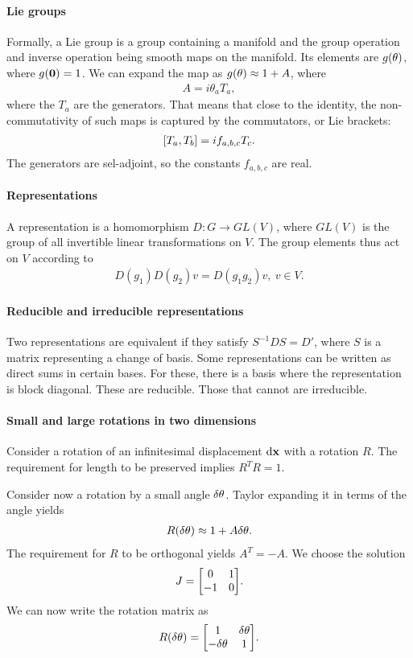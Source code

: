 \paragraph{Lie groups}
Formally, a Lie group is a group containing a manifold and the group operation and inverse operation being smooth maps on the manifold. Its elements are $g(\vb{\theta})$, where $g(\vb{0}) = 1$. We can expand the map as $g(\vb{\theta})\approx 1 + A$, where
\begin{align*}
A = i\theta_{a}T_{a},
\end{align*}
where the $T_{a}$ are the generators. That means that close to the identity, the non-commutativity of such maps is captured by the commutators, or Lie brackets:
\begin{align*}
\left[T_{a}, T_{b}\right] = if_{a, b, c}T_{c}.
\end{align*}
The generators are sel-adjoint, so the constants $f_{a, b, c}$ are real.

\paragraph{Representations}
A representation is a homomorphism $D: G\to GL(V)$, where $GL(V)$ is the group of all invertible linear transformations on $V$. The group elements thus act on $V$ according to
\begin{align*}
D(g_{1})D(g_{2})v = D(g_{1}g_{2})v,\ v\in V.
\end{align*}

\paragraph{Reducible and irreducible representations}
Two representations are equivalent if they satisfy $S^{-1}DS = D'$, where $S$ is a matrix representing a change of basis. Some representations can be written as direct sums in certain bases. For these, there is a basis where the representation is block diagonal. These are reducible. Those that cannot are irreducible.

\paragraph{Small and large rotations in two dimensions}
Consider a rotation of an infinitesimal displacement $\dd{\vb{x}}$ with a rotation $R$. The requirement for length to be preserved implies $R^{T}R = 1$.

Consider now a rotation by a small angle $\delta \theta$. Taylor expanding it in terms of the angle yields
\begin{align*}
R(\delta \theta) \approx 1 + A\delta \theta.
\end{align*}
The requirement for $R$ to be orthogonal yields $A^{T} = -A$. We choose the solution
\begin{align*}
J =
\mqty[
0  & 1 \\
-1 & 0
].
\end{align*}
We can now write the rotation matrix as
\begin{align*}
R(\var{\theta}) =
\mqty[
1             & \var{\theta} \\
-\var{\theta} & 1
].
\end{align*}

